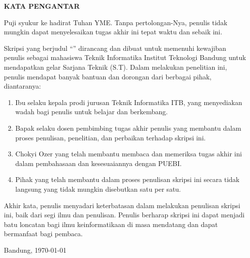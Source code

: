 \clearpage

\begin{center}
 \textbf{\large KATA PENGANTAR}\\[3em]
\end{center}

Puji syukur ke hadirat Tuhan YME.\@
Tanpa pertolongan-Nya, penulis tidak mungkin dapat menyelesaikan tugas akhir ini tepat waktu dan sebaik ini.

Skripsi yang berjudul ``\textit{\thetitle}'' dirancang dan dibuat untuk memenuhi kewajiban penulis sebagai mahasiswa Teknik Informatika Institut Teknologi Bandung untuk mendapatkan gelar Sarjana Teknik (S.T).
Dalam melakukan penelitian ini, penulis mendapat banyak bantuan dan dorongan dari berbagai pihak, diantaranya:
\begin{enumerate}
  \item Ibu \dean{} selaku kepala prodi jurusan Teknik Informatika ITB, yang menyediakan wadah bagi penulis untuk belajar dan berkembang.
  \item Bapak \supervisor{} selaku dosen pembimbing tugas akhir penulis yang membantu dalam proses penulisan, penelitian, dan perbaikan terhadap skripsi ini.
  \item Chokyi Ozer yang telah membantu membaca dan memeriksa tugas akhir ini dalam pembahasaan dan kesesuaiannya dengan PUEBI.\@ 
  \item Pihak yang telah membantu dalam proses penulisan skripsi ini secara tidak langsung yang tidak mungkin disebutkan satu per satu. 
\end{enumerate}

Akhir kata, penulis menyadari keterbatasan dalam melakukan penulisan skripsi ini, baik dari segi ilmu dan penulisan.
Penulis berharap skripsi ini dapat menjadi batu loncatan bagi ilmu keinformatikaan di masa mendatang dan dapat bermanfaat bagi pembaca.

Bandung, \today

\theauthor{}


